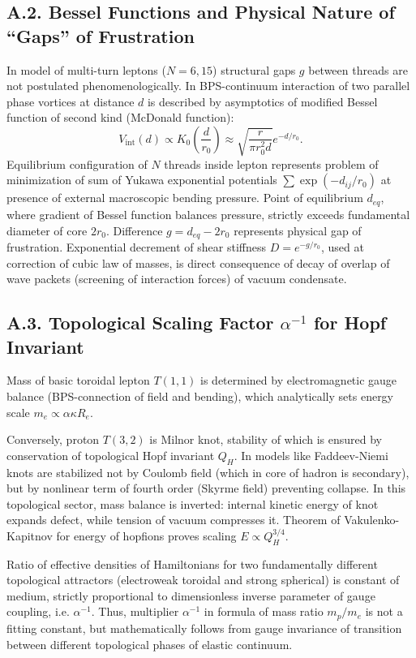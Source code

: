 \documentclass[12pt,a4paper]{article}
\begin{document}
\subsection{A.2. Bessel Functions and Physical Nature of ``Gaps'' of Frustration}
In model of multi-turn leptons ($N=6, 15$) structural gaps $g$ between threads are not postulated phenomenologically. In BPS-continuum interaction of two parallel phase vortices at distance $d$ is described by asymptotics of modified Bessel function of second kind (McDonald function):
\begin{equation}
    V_{\text{int}}(d) \propto K_0\left(\frac{d}{r_0}\right) \approx \sqrt{\frac{r}{\pi r_0^2 d}} e^{-d/r_0}.
    \label{eq:bessel_potential}
\end{equation}
Equilibrium configuration of $N$ threads inside lepton represents problem of minimization of sum of Yukawa exponential potentials $\sum \exp(-d_{ij}/r_0)$ at presence of external macroscopic bending pressure. Point of equilibrium $d_{eq}$, where gradient of Bessel function balances pressure, strictly exceeds fundamental diameter of core $2r_0$. Difference $g = d_{eq} - 2r_0$ represents physical gap of frustration. Exponential decrement of shear stiffness $D = e^{-g/r_0}$, used at correction of cubic law of masses, is direct consequence of decay of overlap of wave packets (screening of interaction forces) of vacuum condensate.

\subsection{A.3. Topological Scaling Factor $\alpha^{-1}$ for Hopf Invariant}
Mass of basic toroidal lepton $T(1,1)$ is determined by electromagnetic gauge balance (BPS-connection of field and bending), which analytically sets energy scale $m_e \propto \alpha \kappa R_e$.

Conversely, proton $T(3,2)$ is Milnor knot, stability of which is ensured by conservation of topological Hopf invariant $Q_H$. In models like Faddeev-Niemi knots are stabilized not by Coulomb field (which in core of hadron is secondary), but by nonlinear term of fourth order (Skyrme field) preventing collapse. In this topological sector, mass balance is inverted: internal kinetic energy of knot expands defect, while tension of vacuum compresses it. Theorem of Vakulenko-Kapitnov for energy of hopfions proves scaling $E \propto Q_H^{3/4}$.

Ratio of effective densities of Hamiltonians for two fundamentally different topological attractors (electroweak toroidal and strong spherical) is constant of medium, strictly proportional to dimensionless inverse parameter of gauge coupling, i.e. $\alpha^{-1}$. Thus, multiplier $\alpha^{-1}$ in formula of mass ratio $m_p/m_e$ is not a fitting constant, but mathematically follows from gauge invariance of transition between different topological phases of elastic continuum.
\end{document}
